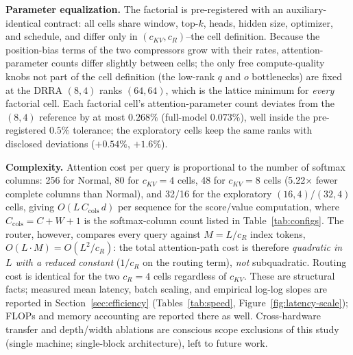 \textbf{Parameter equalization.} The factorial is pre-registered with an
auxiliary-identical contract: all cells share window, top-$k$, heads, hidden
size, optimizer, and schedule, and differ only in $(c_{KV}, c_R)$--the cell
definition. Because the position-bias terms of the two compressors grow with
their rates, attention-parameter counts differ slightly between cells; the
only free compute-quality knobs not part of the cell definition (the
low-rank $q$ and $o$ bottlenecks) are fixed at the DRRA $(8,4)$ ranks
$(64, 64)$, which is the lattice minimum for \emph{every} factorial cell. Each
factorial cell's attention-parameter count deviates from the $(8,4)$ reference
by at most $0.268\%$ (full-model $0.073\%$), well inside the pre-registered
$0.5\%$ tolerance; the exploratory cells keep the same ranks with disclosed
deviations ($+0.54\%$, $+1.6\%$).

\textbf{Complexity.} Attention cost per query is proportional to the number
of softmax columns: 256 for Normal, 80 for $c_{KV}{=}4$ cells, 48 for
$c_{KV}{=}8$ cells (5.22$\times$ fewer complete columns than Normal), and 32/16 for the
exploratory $(16,4)$/$(32,4)$ cells, giving
$O(L \, C_{\mathrm{cols}} \, d)$ per sequence for the score/value
computation, where $C_{\mathrm{cols}} = C + W + 1$ is the softmax-column
count listed in Table~\ref{tab:configs}. The router, however, compares every query against
$M = L/c_R$ index tokens, $O(L \cdot M) = O(L^2/c_R)$: the total
attention-path cost is therefore \emph{quadratic in $L$ with a reduced
constant} ($1/c_R$ on the routing term), \emph{not} subquadratic. Routing
cost is identical for the two $c_R{=}4$ cells regardless of $c_{KV}$. These
are structural facts; measured mean latency, batch scaling, and empirical
log-log slopes are reported in Section~\ref{sec:efficiency}
(Tables~\ref{tab:speed}, Figure~\ref{fig:latency-scale}); FLOPs and memory
accounting are reported there as well. Cross-hardware transfer and
depth/width ablations are conscious scope exclusions of this study
(single machine; single-block architecture), left to future work.
